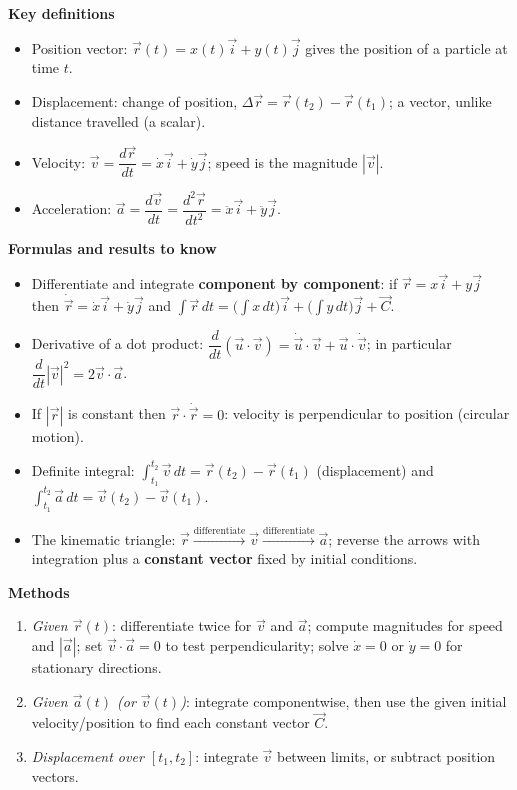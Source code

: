 \documentclass[11pt]{article}
\newcommand{\cle}[1]{{\popxbold\color{popdark}#1}}
\begin{document}
\begin{bilan}
\textbf{Key definitions}
\begin{itemize}
\item \cle{Position vector}: $\vec r(t)=x(t)\vec i+y(t)\vec j$ gives the position of a particle at time $t$.
\item \cle{Displacement}: change of position, $\Delta\vec r=\vec r(t_2)-\vec r(t_1)$; a vector, unlike distance travelled (a scalar).
\item \cle{Velocity}: $\vec v=\dfrac{d\vec r}{dt}=\dot{x}\vec i+\dot{y}\vec j$; speed is the magnitude $|\vec v|$.
\item \cle{Acceleration}: $\vec a=\dfrac{d\vec v}{dt}=\dfrac{d^2\vec r}{dt^2}=\ddot{x}\vec i+\ddot{y}\vec j$.
\end{itemize}

\textbf{Formulas and results to know}
\begin{itemize}
\item Differentiate and integrate \textbf{component by component}: if $\vec r=x\vec i+y\vec j$ then $\dot{\vec r}=\dot{x}\vec i+\dot{y}\vec j$ and $\displaystyle\int\vec r\,dt=\Big(\int x\,dt\Big)\vec i+\Big(\int y\,dt\Big)\vec j+\vec C$.
\item Derivative of a dot product: $\dfrac{d}{dt}(\vec u\cdot\vec v)=\dot{\vec u}\cdot\vec v+\vec u\cdot\dot{\vec v}$; in particular $\dfrac{d}{dt}|\vec v|^2=2\vec v\cdot\vec a$.
\item If $|\vec r|$ is constant then $\vec r\cdot\dot{\vec r}=0$: velocity is perpendicular to position (circular motion).
\item Definite integral: $\displaystyle\int_{t_1}^{t_2}\vec v\,dt=\vec r(t_2)-\vec r(t_1)$ (displacement) and $\displaystyle\int_{t_1}^{t_2}\vec a\,dt=\vec v(t_2)-\vec v(t_1)$.
\item The kinematic triangle: $\vec r \xrightarrow{\text{differentiate}} \vec v \xrightarrow{\text{differentiate}} \vec a$; reverse the arrows with integration plus a \textbf{constant vector} fixed by initial conditions.
\end{itemize}

\textbf{Methods}
\begin{enumerate}
\item \emph{Given $\vec r(t)$}: differentiate twice for $\vec v$ and $\vec a$; compute magnitudes for speed and $|\vec a|$; set $\vec v\cdot\vec a=0$ to test perpendicularity; solve $\dot x=0$ or $\dot y=0$ for stationary directions.
\item \emph{Given $\vec a(t)$ (or $\vec v(t)$)}: integrate componentwise, then use the given initial velocity/position to find each constant vector $\vec C$.
\item \emph{Displacement over $[t_1,t_2]$}: integrate $\vec v$ between limits, or subtract position vectors.
\end{enumerate}


\end{bilan}
\end{document}
